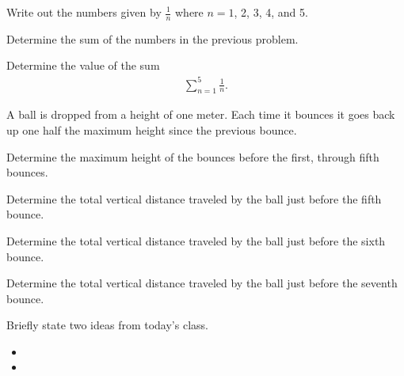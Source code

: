 


\begin{problem}
  \item Write out the numbers given by $\frac{1}{n}$ where $n=1$,
    2, 3, 4, and 5.
    \vfill
  \item Determine the sum of the numbers in the previous problem.
    \vfill
  \item Determine the value of the sum
    \begin{eqnarray*}
      \sum_{n=1}^{5} \frac{1}{n}.
    \end{eqnarray*}
\end{problem}



\begin{problem}
\item A ball is dropped from a height of one meter. Each time it
  bounces it goes back up one half the maximum height since the
  previous bounce.
  \begin{subproblem}
  \item Determine the maximum height of the bounces before the first,
    through fifth bounces.
    \vfill
  \item Determine the total vertical distance traveled by the ball
    just before the fifth bounce.
    \vfill
  \item Determine the total vertical distance traveled by the ball
    just before the sixth bounce.
    \vfill
  \item Determine the total vertical distance traveled by the ball
    just before the seventh bounce.
    \vfill
  \end{subproblem}
\end{problem}

\postClass

\begin{problem}
\item Briefly state two ideas from today's class.
  \begin{itemize}
  \item 
  \item 
  \end{itemize}
\item 
  \begin{subproblem}
    \item
  \end{subproblem}
\end{problem}

